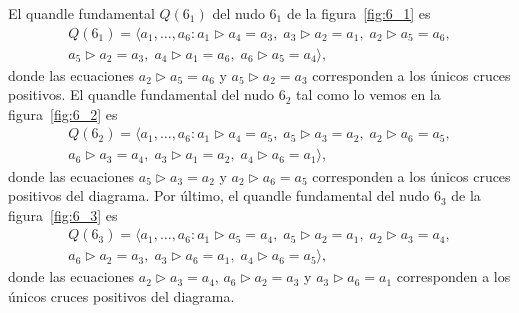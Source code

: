 \documentclass[graybox]{svmult}
\begin{document}
	\label{block:Q(6_1):fundamental_quandle}
	\label{block:Q(6_2):fundamental_quandle}
	\label{block:Q(6_3):fundamental_quandle}
    El quandle fundamental $Q(6_1)$ del nudo $6_1$ de la figura~\ref{fig:6_1} es
	\begin{multline}
		Q(6_1)=\langle a_1,\dots,a_6:
		a_1\triangleright a_4=a_3,\;
		a_3\triangleright a_2=a_1,\;
		a_2\triangleright a_5=a_6,\\
		a_5\triangleright a_2=a_3,\;
		a_4\triangleright a_1=a_6,\;
		a_6\triangleright a_5=a_4\rangle,
	\end{multline}
    donde las ecuaciones $a_2\triangleright a_5=a_6$ y $a_5\triangleright
    a_2=a_3$ corresponden a los únicos cruces positivos. 
    El quandle fundamental del nudo $6_2$ tal como lo vemos en la
    figura~\ref{fig:6_2} es
	\begin{multline}
		Q(6_2)=\langle a_1,\dots,a_6:
		a_1\triangleright a_4=a_5,\;
		a_5\triangleright a_3=a_2,\;
		a_2\triangleright a_6=a_5,\\
		a_6\triangleright a_3=a_4,\;
		a_3\triangleright a_1=a_2,\;
		a_4\triangleright a_6=a_1\rangle,
	\end{multline}
    donde las ecuaciones $a_5\triangleright a_3=a_2$ y $a_2\triangleright
    a_6=a_5$ corresponden a los únicos cruces positivos del diagrama.  
    Por último, el quandle fundamental del nudo $6_3$ de la figura~\ref{fig:6_3} es 
	\begin{multline}
		\label{eq:Q(6_3)}
		Q(6_3)=\langle a_1,\dots,a_6:
			a_1\triangleright a_5=a_4,\;
			a_5\triangleright a_2=a_1,\;
			a_2\triangleright a_3=a_4,\\
			a_6\triangleright a_2=a_3,\;
			a_3\triangleright a_6=a_1,\;
			a_4\triangleright a_6=a_5\rangle,
	\end{multline}
    donde las ecuaciones $a_2\triangleright a_3=a_4$, $a_6\triangleright
    a_2=a_3$ y $a_3\triangleright a_6=a_1$ corresponden a los únicos cruces
    positivos del diagrama. 
\end{document}
